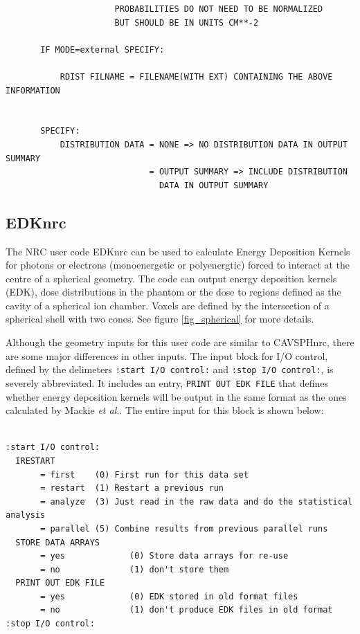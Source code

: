 \documentclass[12pt,twoside]{article}  %
\begin{document}
\begin{verbatim}
                      PROBABILITIES DO NOT NEED TO BE NORMALIZED
                      BUT SHOULD BE IN UNITS CM**-2

       IF MODE=external SPECIFY:

           RDIST FILNAME = FILENAME(WITH EXT) CONTAINING THE ABOVE INFORMATION


       SPECIFY:
           DISTRIBUTION DATA = NONE => NO DISTRIBUTION DATA IN OUTPUT SUMMARY
                             = OUTPUT SUMMARY => INCLUDE DISTRIBUTION
                               DATA IN OUTPUT SUMMARY
\end{verbatim}

\subsection{EDKnrc}

The NRC user code EDKnrc can be used to calculate Energy Deposition Kernels
for photons or electrons (monoenergetic or polyenergtic) forced to interact 
at the centre of a spherical
geometry\cite{Ma05}.  The code can output energy deposition kernels (EDK), 
dose distributions in the phantom or the dose to regions defined as the 
cavity of a spherical ion chamber.  Voxels are defined by the intersection
of a spherical shell with two cones. See figure \ref{fig_spherical}
for more details.

Although the geometry inputs for this user code are similar to CAVSPHnrc,
there are some major differences in other inputs. The input block for I/O 
control, defined by the delimeters {\tt :start I/O control:} and 
{\tt:stop I/O control:}, is severely abbreviated.  It includes an entry,
{\tt PRINT OUT EDK FILE} that defines whether energy deposition
kernels will be output in the same format as the ones calculated by
Mackie {\it et al.}\cite{Ma88}. The entire input for this block
is shown below:

\begin{verbatim}

:start I/O control:
  IRESTART
       = first    (0) First run for this data set
       = restart  (1) Restart a previous run
       = analyze  (3) Just read in the raw data and do the statistical analysis
       = parallel (5) Combine results from previous parallel runs
  STORE DATA ARRAYS
       = yes             (0) Store data arrays for re-use
       = no              (1) don't store them
  PRINT OUT EDK FILE
       = yes             (0) EDK stored in old format files
       = no              (1) don't produce EDK files in old format
:stop I/O control:
\end{verbatim}
\end{document}
